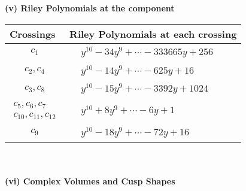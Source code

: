 \documentclass[1p]{elsarticle_modified}
\theoremstyle{definition}
\begin{document}
\newpage\renewcommand{\arraystretch}{1}
\flushleft \textbf{(v) Riley Polynomials at the component}\newline \\
\begin{tabular}{m{50pt}|m{274pt}}
Crossings & \hspace{64pt}Riley Polynomials at each crossing \\
\hline $$\begin{aligned}c_{1}\end{aligned}$$&$\begin{aligned}
&y^{10}-34 y^9+\cdots-333665 y+256
\end{aligned}$\\
\hline $$\begin{aligned}c_{2},c_{4}\end{aligned}$$&$\begin{aligned}
&y^{10}-14 y^9+\cdots-625 y+16
\end{aligned}$\\
\hline $$\begin{aligned}c_{3},c_{8}\end{aligned}$$&$\begin{aligned}
&y^{10}-15 y^9+\cdots-3392 y+1024
\end{aligned}$\\
\hline $$\begin{aligned}c_{5},c_{6},c_{7}\\c_{10},c_{11},c_{12}\end{aligned}$$&$\begin{aligned}
&y^{10}+8 y^9+\cdots-6 y+1
\end{aligned}$\\
\hline $$\begin{aligned}c_{9}\end{aligned}$$&$\begin{aligned}
&y^{10}-18 y^9+\cdots-72 y+16
\end{aligned}$\\
\hline
\end{tabular}\\~\\
\newpage\flushleft \textbf{(vi) Complex Volumes and Cusp Shapes}
\end{document}

